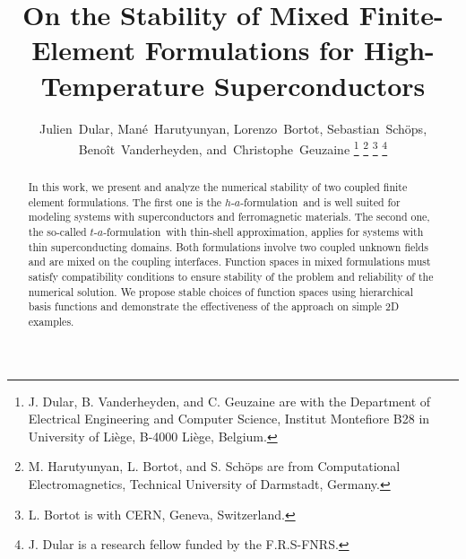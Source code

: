 \documentclass[journal]{IEEEtran}
\newcommand{\haf}{$h$-$a$-formulation\ }
\newcommand{\taf}{$t$-$a$-formulation\ }
\begin{document}
\title{On the Stability of Mixed Finite-Element Formulations for High-Temperature Superconductors}

\author{Julien~Dular, Mané~Harutyunyan, Lorenzo~Bortot, Sebastian~Schöps,
        Benoît~Vanderheyden,
        and~Christophe~Geuzaine%
\thanks{J. Dular, B. Vanderheyden, and C. Geuzaine are with the Department of Electrical Engineering and Computer Science, Institut Montefiore B28 in University of Liège, B-4000 Liège, Belgium.}%
\thanks{M. Harutyunyan, L. Bortot, and S. Schöps are from Computational Electromagnetics, Technical University of Darmstadt, Germany.}%
\thanks{L. Bortot is with CERN, Geneva, Switzerland.}%
\thanks{J. Dular is a research fellow funded by the F.R.S-FNRS.}}

\maketitle


\begin{abstract}

In this work, we present and analyze the numerical stability of two coupled finite element formulations. The first one is the \haf and is well suited for modeling systems with superconductors and ferromagnetic materials. The second one, the so-called \taf with thin-shell approximation, applies for systems with thin superconducting domains. Both formulations involve two coupled unknown fields and are mixed on the coupling interfaces. Function spaces in mixed formulations must satisfy compatibility conditions to ensure stability of the problem and reliability of the numerical solution. We propose stable choices of function spaces using hierarchical basis functions and demonstrate the effectiveness of the approach on simple 2D examples.
\end{abstract}
\end{document}
